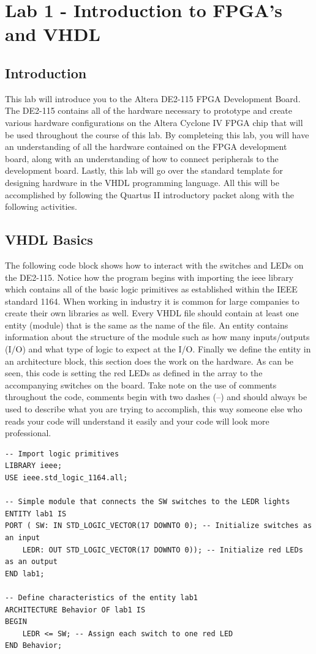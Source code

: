 \section{Lab 1 - Introduction to FPGA's and VHDL}

\subsection{Introduction}
This lab will introduce you to the Altera DE2-115 FPGA Development Board. The DE2-115 contains all of the hardware necessary to prototype and create various hardware configurations on the Altera Cyclone IV FPGA chip that will be used throughout the course of this lab. By completeing this lab, you will have an understanding of all the hardware contained on the FPGA development board, along with an understanding of how to connect peripherals to the development board. Lastly, this lab will go over the standard template for designing hardware in the VHDL programming language. All this will be accomplished by following the Quartus II introductory packet along with the following activities.

\subsection{VHDL Basics}

The following code block shows how to interact with the switches and LEDs on the DE2-115. Notice how the program begins with importing the ieee library which contains all of the basic logic primitives as established within the IEEE standard 1164. When working in industry it is common for large companies to create their own libraries as well. Every VHDL file should contain at least one entity (module) that is the same as the name of the file. An entity contains information about the structure of the module such as how many inputs/outputs (I/O) and what type of logic to expect at the I/O. Finally we define the entity in an architecture block, this section does the work on the hardware. As can be seen, this code is setting the red LEDs as defined in the array to the accompanying switches on the board. Take note on the use of comments throughout the code, comments begin with two dashes (--) and should always be used to describe what you are trying to accomplish, this way someone else who reads your code will understand it easily and your code will look more professional. 

\begin{lstlisting}
-- Import logic primitives
LIBRARY ieee;
USE ieee.std_logic_1164.all;

-- Simple module that connects the SW switches to the LEDR lights
ENTITY lab1 IS
PORT ( SW: IN STD_LOGIC_VECTOR(17 DOWNTO 0); -- Initialize switches as an input
	LEDR: OUT STD_LOGIC_VECTOR(17 DOWNTO 0)); -- Initialize red LEDs as an output
END lab1;

-- Define characteristics of the entity lab1
ARCHITECTURE Behavior OF lab1 IS
BEGIN
	LEDR <= SW; -- Assign each switch to one red LED
END Behavior;
\end{lstlisting}


